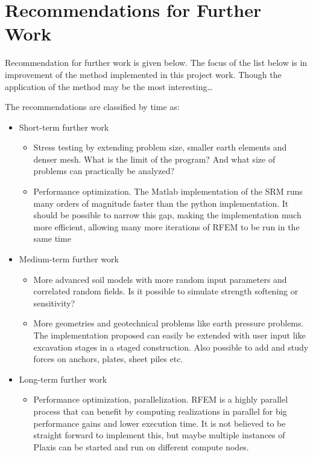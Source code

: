 \section{Recommendations for Further Work}
Recommendation for further work is given below. The focus of the list below is in improvement of the method implemented in this project work. Though the application of the method may be the most interesting\ldots

The recommendations are classified by time as:
\begin{itemize}
\item Short-term further work
	\begin{itemize}
	\item{Stress testing by extending problem size, smaller earth elements and denser mesh. What is the limit of the program? And what size of problems can practically be analyzed?}
	\item{Performance optimization. The Matlab implementation of the SRM runs many orders of magnitude faster than the python implementation. It should be possible to narrow this gap, making the implementation much more efficient, allowing many more iterations of RFEM to be run in the same time}
	\end{itemize}
\item Medium-term further work

	\begin{itemize}
        \item{More advanced soil models with more random input parameters and correlated random fields. Is it possible to simulate strength softening or sensitivity?}
        \item{More geometries and geotechnical problems like earth pressure problems. The implementation proposed can easily be extended with user input like excavation stages in a staged construction. Also possible to add and study forces on anchors, plates, sheet piles etc.}
        \end{itemize}
\item Long-term further work

	\begin{itemize}
	\item{Performance optimization, parallelization. RFEM is a highly parallel process that can benefit by computing realizations in parallel for big performance gains and lower execution time. It is not believed to be straight forward to implement this, but maybe multiple instances of Plaxis can be started and run on different compute nodes. }
	\end{itemize}
\end{itemize}
